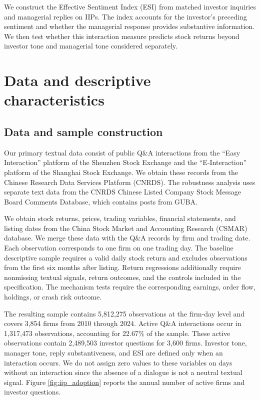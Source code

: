 \documentclass[12pt]{article}
\begin{document}
We construct the Effective Sentiment Index (ESI) from matched investor inquiries and managerial replies on IIPs. The index accounts for the investor's preceding sentiment and whether the managerial response provides substantive information. We then test whether this interaction measure predicts stock returns beyond investor tone and managerial tone considered separately.



\section{Data and descriptive characteristics}\label{sec:data}

\subsection{Data and sample construction}

Our primary textual data consist of public Q\&A interactions from the ``Easy Interaction'' platform of the Shenzhen Stock Exchange and the ``E-Interaction'' platform of the Shanghai Stock Exchange. We obtain these records from the Chinese Research Data Services Platform (CNRDS). The robustness analysis uses separate text data from the CNRDS Chinese Listed Company Stock Message Board Comments Database, which contains posts from GUBA.

We obtain stock returns, prices, trading variables, financial statements, and listing dates from the China Stock Market and Accounting Research (CSMAR) database. We merge these data with the Q\&A records by firm and trading date. Each observation corresponds to one firm on one trading day. The baseline descriptive sample requires a valid daily stock return and excludes observations from the first six months after listing. Return regressions additionally require nonmissing textual signals, return outcomes, and the controls included in the specification. The mechanism tests require the corresponding earnings, order flow, holdings, or crash risk outcome.

The resulting sample contains 5,812,275 observations at the firm-day level and covers 3,854 firms from 2010 through 2024. Active Q\&A interactions occur in 1,317,473 observations, accounting for 22.67\% of the sample. These active observations contain 2,489,503 investor questions for 3,600 firms. Investor tone, manager tone, reply substantiveness, and ESI are defined only when an interaction occurs. We do not assign zero values to these variables on days without an interaction since the absence of a dialogue is not a neutral textual signal. Figure \ref{fig:iip_adoption} reports the annual number of active firms and investor questions.
\end{document}
